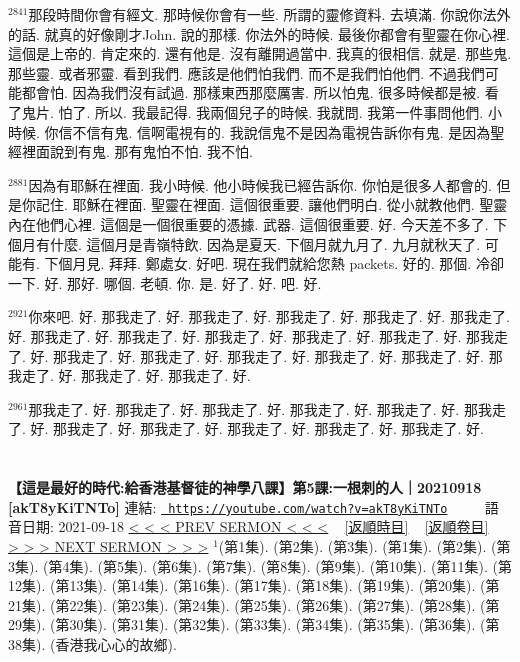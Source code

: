 \documentclass{book}
\begin{document}
$^{2841}$那段時間你會有經文.
那時候你會有一些.
所謂的靈修資料.
去填滿.
你說你法外的話.
就真的好像剛才John.
說的那樣.
你法外的時候.
最後你都會有聖靈在你心裡.
這個是上帝的.
肯定來的.
還有他是.
沒有離開過當中.
我真的很相信.
就是.
那些鬼.
那些靈.
或者邪靈.
看到我們.
應該是他們怕我們.
而不是我們怕他們.
不過我們可能都會怕.
因為我們沒有試過.
那樣東西那麼厲害.
所以怕鬼.
很多時候都是被.
看了鬼片.
怕了.
所以.
我最記得.
我兩個兒子的時候.
我就問.
我第一件事問他們.
小時候.
你信不信有鬼.
信啊電視有的.
我說信鬼不是因為電視告訴你有鬼.
是因為聖經裡面說到有鬼.
那有鬼怕不怕.
我不怕.

$^{2881}$因為有耶穌在裡面.
我小時候.
他小時候我已經告訴你.
你怕是很多人都會的.
但是你記住.
耶穌在裡面.
聖靈在裡面.
這個很重要.
讓他們明白.
從小就教他們.
聖靈內在他們心裡.
這個是一個很重要的憑據.
武器.
這個很重要.
好.
今天差不多了.
下個月有什麼.
這個月是青嶺特飲.
因為是夏天.
下個月就九月了.
九月就秋天了.
可能有.
下個月見.
拜拜.
鄭處女.
好吧.
現在我們就給您熱 packets.
好的.
那個.
冷卻一下.
好.
那好.
哪個.
老頓.
你.
是.
好了.
好.
吧.
好.

$^{2921}$你來吧.
好.
那我走了.
好.
那我走了.
好.
那我走了.
好.
那我走了.
好.
那我走了.
好.
那我走了.
好.
那我走了.
好.
那我走了.
好.
那我走了.
好.
那我走了.
好.
那我走了.
好.
那我走了.
好.
那我走了.
好.
那我走了.
好.
那我走了.
好.
那我走了.
好.
那我走了.
好.
那我走了.
好.
那我走了.
好.

$^{2961}$那我走了.
好.
那我走了.
好.
那我走了.
好.
那我走了.
好.
那我走了.
好.
那我走了.
好.
那我走了.
好.
那我走了.
好.
那我走了.
好.
那我走了.
好.
那我走了.
好.
\newpage



\section{}
\label{sec:akT8yKiTNTo}
\textbf{【這是最好的時代:給香港基督徒的神學八課】第5課:一根刺的人｜20210918 [akT8yKiTNTo]}
\newline
\newline
連結: \href{https://youtube.com/watch?v=akT8yKiTNTo}{\texttt{ https://youtube.com/watch?v=akT8yKiTNTo}} ~~~~ 語音日期: 2021-09-18 
\newline
\newline
\hyperref[sec:Wv0tPAVEIA8]{\small{< < < PREV SERMON < < <}}
~
\hyperref[sec:index_chronic]{\small{[返順時目]}}
~
\hyperref[sec:index_scriptual]{\small{[返順卷目]}}
~
\hyperref[sec:TgQ5_ITPOW8]{\small{> > > NEXT SERMON > > >}}
\newline
\newline
$^{1}$(第1集).
(第2集).
(第3集).
(第1集).
(第2集).
(第3集).
(第4集).
(第5集).
(第6集).
(第7集).
(第8集).
(第9集).
(第10集).
(第11集).
(第12集).
(第13集).
(第14集).
(第16集).
(第17集).
(第18集).
(第19集).
(第20集).
(第21集).
(第22集).
(第23集).
(第24集).
(第25集).
(第26集).
(第27集).
(第28集).
(第29集).
(第30集).
(第31集).
(第32集).
(第33集).
(第34集).
(第35集).
(第36集).
(第38集).
(香港我心心的故鄉).
\end{document}

